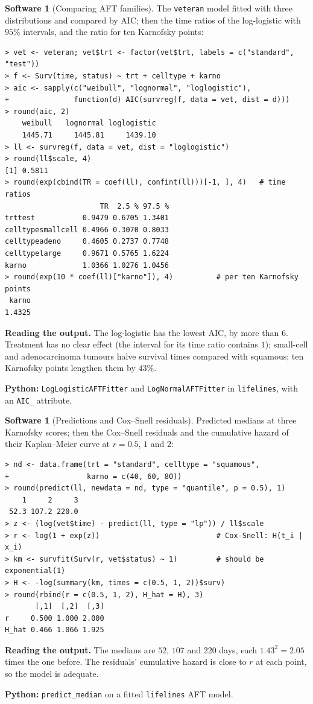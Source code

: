 \documentclass[11pt,a4paper]{article}
\numberwithin{equation}{section}
\theoremstyle{definition}
\newtheorem{software}[thm]{Software}
\begin{document}
\begin{software}[Comparing AFT families]
\label{sw:aftvet}
The \texttt{veteran} model fitted with three distributions and compared by AIC; then the time ratios of the log-logistic with $95\%$ intervals, and the ratio for ten Karnofsky points:
{\small\begin{verbatim}
> vet <- veteran; vet$trt <- factor(vet$trt, labels = c("standard", "test"))
> f <- Surv(time, status) ~ trt + celltype + karno
> aic <- sapply(c("weibull", "lognormal", "loglogistic"),
+               function(d) AIC(survreg(f, data = vet, dist = d)))
> round(aic, 2)
    weibull   lognormal loglogistic 
    1445.71     1445.81     1439.10 
> ll <- survreg(f, data = vet, dist = "loglogistic")
> round(ll$scale, 4)
[1] 0.5811
> round(exp(cbind(TR = coef(ll), confint(ll)))[-1, ], 4)   # time ratios
                      TR  2.5 % 97.5 %
trttest           0.9479 0.6705 1.3401
celltypesmallcell 0.4966 0.3070 0.8033
celltypeadeno     0.4605 0.2737 0.7748
celltypelarge     0.9671 0.5765 1.6224
karno             1.0366 1.0276 1.0456
> round(exp(10 * coef(ll)["karno"]), 4)          # per ten Karnofsky points
 karno 
1.4325 
\end{verbatim}}
\textbf{Reading the output.} The log-logistic has the lowest AIC, by more than $6$. Treatment has no clear effect (the interval for its time ratio contains $1$); small-cell and adenocarcinoma tumours halve survival times compared with squamous; ten Karnofsky points lengthen them by $43\%$.

\textbf{Python:} \texttt{LogLogisticAFTFitter} and \texttt{LogNormalAFTFitter} in \texttt{lifelines}, with an \texttt{AIC\_} attribute.
\end{software}

\begin{software}[Predictions and Cox--Snell residuals]
\label{sw:aftpredict}
Predicted medians at three Karnofsky scores; then the Cox--Snell residuals and the cumulative hazard of their Kaplan--Meier curve at $r = 0.5$, $1$ and $2$:
{\small\begin{verbatim}
> nd <- data.frame(trt = "standard", celltype = "squamous",
+                  karno = c(40, 60, 80))
> round(predict(ll, newdata = nd, type = "quantile", p = 0.5), 1)
    1     2     3 
 52.3 107.2 220.0 
> z <- (log(vet$time) - predict(ll, type = "lp")) / ll$scale
> r <- log(1 + exp(z))                           # Cox-Snell: H(t_i | x_i)
> km <- survfit(Surv(r, vet$status) ~ 1)         # should be exponential(1)
> H <- -log(summary(km, times = c(0.5, 1, 2))$surv)
> round(rbind(r = c(0.5, 1, 2), H_hat = H), 3)
       [,1]  [,2]  [,3]
r     0.500 1.000 2.000
H_hat 0.466 1.066 1.925
\end{verbatim}}
\textbf{Reading the output.} The medians are $52$, $107$ and $220$ days, each $1.43^2 = 2.05$ times the one before. The residuals' cumulative hazard is close to $r$ at each point, so the model is adequate.

\textbf{Python:} \texttt{predict\_median} on a fitted \texttt{lifelines} AFT model.
\end{software}
\end{document}

